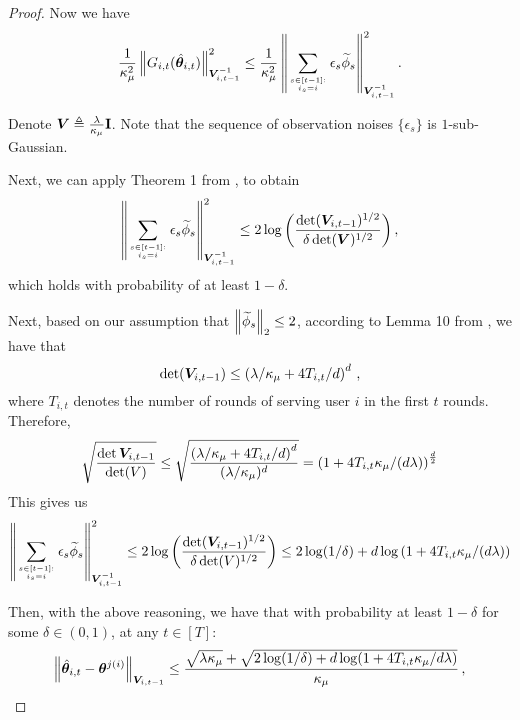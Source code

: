 \begin{proof}
Now we have
\begin{equation}
    \label{eqn:parUB}
    \frac{1}{\kappa_\mu^2} \left\| G_{i,t}(\hat{\boldsymbol{\theta}}_{i,t}) \right\|_{\boldsymbol{V}_{i,t-1}^{-1}}^2 \le \frac{1}{\kappa_\mu^2} \left\| \sum_{s\in[t-1]:\atop i_s=i}\epsilon_s \widetilde{\phi}_s \right\|_{\boldsymbol{V}_{i,t-1}^{-1}}^2.
\end{equation}

Denote $\boldsymbol{V} \triangleq \frac{\lambda}{\kappa_\mu} \mathbf{I}$.
Note that the sequence of observation noises $\{\epsilon_s\}$ is $1$-sub-Gaussian.

Next, we can apply Theorem 1 from \cite{abbasi2011improved}, to obtain
\begin{equation}
\left\| \sum_{s\in[t-1]:\atop i_s=i}\epsilon_s \widetilde{\phi}_s \right\|_{\boldsymbol{V}_{i,t-1}^{-1}}^2 \leq 2\log\left( \frac{\det(\boldsymbol{V}_{i,t-1})^{1/2}}{\delta\det(\boldsymbol{V})^{1/2}} \right),
\end{equation}
which holds with probability of at least $1-\delta$.

Next, based on our assumption that $\left\| \widetilde{\phi}_s \right\|_2 \leq 2$, according to Lemma 10 from \cite{abbasi2011improved}, we have that
\begin{equation}
\det(\boldsymbol{V}_{i,t-1}) \leq \left( \lambda/\kappa_\mu + 4T_{i,t} / d \right)^d\,,
\end{equation}
where $T_{i,t}$ denotes the number of rounds of serving user $i$ in the first $t$ rounds.
Therefore, 
\begin{equation}
\sqrt{\frac{\det{\boldsymbol{V}_{i,t-1}}}{\det(V)}} \leq \sqrt{\frac{\left( \lambda/\kappa_\mu + 4T_{i,t} / d \right)^d}{(\lambda/\kappa_\mu)^d}} = \left( 1 + 4T_{i,t}\kappa_{\mu}/(d\lambda) \right)^{\frac{d}{2}}
\label{eq:upper:bound:det:Vt:V}
\end{equation}
This gives us
\begin{equation}
\left\| \sum_{s\in[t-1]:\atop i_s=i}\epsilon_s \widetilde{\phi}_s \right\|_{\boldsymbol{V}_{i,t-1}^{-1}}^2 \leq 2\log\left( \frac{\det(\boldsymbol{V}_{i,t-1})^{1/2}}{\delta\det(V)^{1/2}} \right) \leq 2\log(1/\delta) + d\log\left( 1 + 4T_{i,t}\kappa_{\mu}/(d\lambda) \right)
\label{eq:upper:bound:proof:theta:interm}
\end{equation}

Then, with the above reasoning, we have that with probability at least $1-\delta$ for some $\delta\in(0,1)$, at any $t\in[T]$:
\begin{equation}
    \left\| \hat{\boldsymbol{\theta}}_{i,t}-\boldsymbol{\theta}^{j(i)} \right\|_{\boldsymbol{V}_{i,t-1}}\leq\frac{\sqrt{\lambda \kappa_\mu}+\sqrt{2\log(1/\delta)+d\log(1+4T_{i,t}\kappa_\mu/d\lambda)}}{\kappa_\mu}\,,
\end{equation}


\end{proof}

